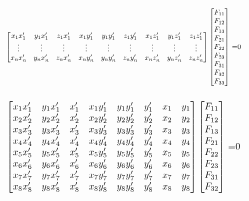 \documentclass[Conference]{IEEEtran}
\begin{document}
\begin{align}\label{eq:fullFundamental}
    \resizebox{0.5\textwidth}{!}{
        $\begin{bmatrix}
            x_1x_1' & y_1x_1' & z_1x_1' & x_1y_1' & y_1y_1' & z_1y_1' & x_1z_1' & y_1z_1' & z_1z_1'\\
            \vdots&\vdots&\vdots&\vdots&\vdots&\vdots&\vdots&\vdots&\vdots\\
            x_nx_n' & y_nx_n' & z_nx_n' & x_ny_n' & y_ny_n' & z_ny_n' & x_nz_n' & y_nz_n' & z_nz_n'\\
        \end{bmatrix}
        \begin{bmatrix}
            F_{11}\\F_{12}\\F_{13}\\F_{21}\\F_{22}\\F_{23}\\F_{31}\\F_{32}\\F_{33}
        \end{bmatrix}$
        =0
    }
\end{align}

\begin{align}\label{eq:expanded8Pt}
    \resizebox{0.5\textwidth}{!}{
        $\begin{bmatrix}
            x_1x_1' & y_1x_1' & x_1' & x_1y_1' & y_1y_1' & y_1' & x_1 & y_1\\
            x_2x_2' & y_2x_2' & x_2' & x_2y_2' & y_2y_2' & y_2' & x_2 & y_2\\
            x_3x_3' & y_3x_3' & x_3' & x_3y_3' & y_3y_3' & y_3' & x_3 & y_3\\
            x_4x_4' & y_4x_4' & x_4' & x_4y_4' & y_4y_4' & y_4' & x_4 & y_4\\
            x_5x_5' & y_5x_5' & x_5' & x_5y_5' & y_5y_5' & y_5' & x_5 & y_5\\
            x_6x_6' & y_6x_6' & x_6' & x_6y_6' & y_6y_6' & y_6' & x_6 & y_6\\
            x_7x_7' & y_7x_7' & x_7' & x_7y_7' & y_7y_7' & y_7' & x_7 & y_7\\
            x_8x_8' & y_8x_8' & x_8' & x_8y_8' & y_8y_8' & y_8' & x_8 & y_8
        \end{bmatrix}
        \begin{bmatrix}
            F_{11}\\F_{12}\\F_{13}\\F_{21}\\F_{22}\\F_{23}\\F_{31}\\F_{32}
        \end{bmatrix}$
        =0
    }
\end{align}
\end{document}
